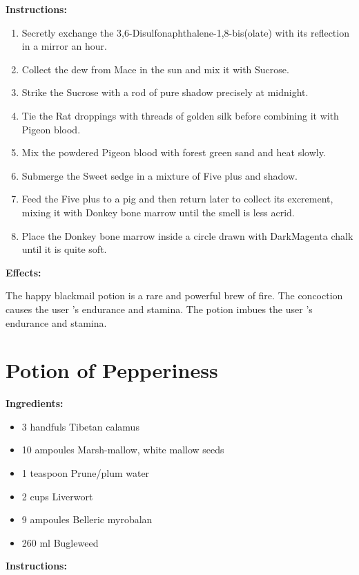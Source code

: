 \documentclass{article}
\begin{document}
\textbf{Instructions:}

\begin{enumerate}
  \item Secretly exchange the 3,6-Disulfonaphthalene-1,8-bis(olate) with its reflection in a mirror an hour.
  \item Collect the dew from Mace in the sun and mix it with Sucrose.
  \item Strike the Sucrose with a rod of pure shadow precisely at midnight.
  \item Tie the Rat droppings with threads of golden silk before combining it with Pigeon blood.
  \item Mix the powdered Pigeon blood with forest green sand and heat slowly.
  \item Submerge the Sweet sedge in a mixture of Five plus and shadow.
  \item Feed the Five plus to a pig and then return later to collect its excrement, mixing it with Donkey bone marrow until the smell is less acrid.
  \item Place the Donkey bone marrow inside a circle drawn with DarkMagenta chalk until it is quite soft.
\end{enumerate}

\textbf{Effects:}

The happy blackmail potion is a rare and powerful brew of fire. The concoction causes the user 's endurance and stamina. The potion imbues the user 's endurance and stamina.

\newpage
\section*{Potion of Pepperiness}

\textbf{Ingredients:}

\begin{itemize}
  \item 3 handfuls Tibetan calamus
  \item 10 ampoules Marsh-mallow, white mallow seeds
  \item 1 teaspoon Prune/plum water
  \item 2 cups Liverwort
  \item 9 ampoules Belleric myrobalan
  \item 260 ml Bugleweed
\end{itemize}

\textbf{Instructions:}
\end{document}
